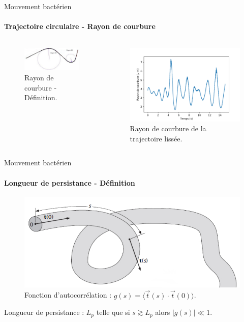 \documentclass[11pt]{beamer}
\begin{document}
\begin{frame}{Mouvement bactérien}
\framesubtitle{Trajectoire circulaire - Rayon de courbure}
\begin{columns}
\begin{figure}
\includegraphics[width=1\linewidth]{rayon_de_courbure.jpg}
\caption{Rayon de courbure - Définition.}
\end{figure}
\begin{figure}
\includegraphics[width=1\linewidth]{rayon.png}
\caption{Rayon de courbure de la trajectoire lissée.}
\end{figure}
\end{columns}
\end{frame}



\begin{frame}{Mouvement bactérien}
\framesubtitle{Longueur de persistance - Définition}
\begin{figure}
\includegraphics[width=0.9\linewidth]{longueur_persistance.jpg}
\caption{Fonction d'autocorrélation : $g(s) = \langle \overrightarrow{t}(s)\cdot\overrightarrow{t}(0)\rangle$.}
\end{figure}
Longueur de persistance : $L_p$ telle que si $s\gtrsim L_p$ alors $\lvert g(s)\rvert \ll 1$.
\end{frame}
\end{document}
